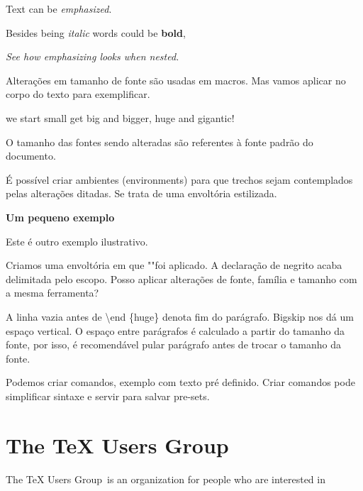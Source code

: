 \documentclass[a4paper, 12pt]{article}
\begin{document}
{\sffamily

Text can be {\em emphasized}.

Besides being {\itshape italic} words could be {\bfseries bold},




{\em See how {\em emphasizing} looks when nested.}

Alterações em tamanho de fonte são usadas em macros.
Mas vamos aplicar no corpo do texto para exemplificar.

\noindent \tiny we \scriptsize start 
\footnotesize \small small
\normalsize get
\large big 
\Large and
\LARGE bigger,
\huge huge and
\Huge gigantic!


\normalsize
O tamanho das fontes sendo alteradas são referentes à fonte padrão do documento.

É possível criar ambientes (environments) para que trechos 
sejam contemplados pelas alterações ditadas.
Se trata de uma envoltória estilizada.

\begin{huge}
    \bfseries
    Um pequeno exemplo

\end{huge}

\bigskip

Este é outro exemplo ilustrativo.


Criamos uma envoltória em que \huge "\normalsize "foi aplicado.
A declaração de negrito acaba delimitada pelo escopo.
Posso aplicar alterações de fonte, família e tamanho com a mesma ferramenta?

A linha vazia antes de \textbackslash end \{huge\} denota fim do parágrafo.
Bigskip nos dá um espaço vertical.
O espaço entre parágrafos é calculado a partir do tamanho 
da fonte, por isso, é recomendável pular parágrafo antes
de trocar o tamanho da fonte.

Podemos criar comandos, exemplo com texto pré definido.
Criar comandos pode simplificar sintaxe e servir para salvar
pre-sets.

\newcommand{\TUG}{TeX Users Group}

\section{The \TUG}

The \TUG\ is an organization for people who are interested in 

}
\end{document}
